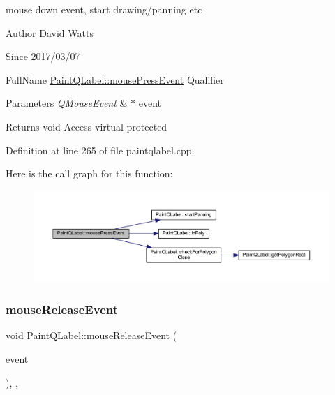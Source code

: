 mouse down event, start drawing/panning etc

\begin{DoxyAuthor}{Author}
David Watts 
\end{DoxyAuthor}
\begin{DoxySince}{Since}
2017/03/07
\end{DoxySince}
Full\+Name \hyperlink{class_paint_q_label_a222bf479767638c91bb0b8b655e9794b}{Paint\+Q\+Label\+::mouse\+Press\+Event} Qualifier 
\begin{DoxyParams}{Parameters}
{\em Q\+Mouse\+Event} & $\ast$ event \\
\hline
\end{DoxyParams}
\begin{DoxyReturn}{Returns}
void Access virtual protected 
\end{DoxyReturn}


Definition at line 265 of file paintqlabel.\+cpp.

Here is the call graph for this function\+:
\nopagebreak
\begin{figure}[H]
\begin{center}
\leavevmode
\includegraphics[width=350pt]{class_paint_q_label_a222bf479767638c91bb0b8b655e9794b_cgraph}
\end{center}
\end{figure}
\mbox{\label{class_paint_q_label_a16f35714b89231d55c733ef94f583ff4}} 
\subsubsection{\texorpdfstring{mouse\+Release\+Event}{mouseReleaseEvent}}
{\footnotesize\ttfamily void Paint\+Q\+Label\+::mouse\+Release\+Event (\begin{DoxyParamCaption}\item[{Q\+Mouse\+Event $\ast$}]{event }\end{DoxyParamCaption})\hspace{0.3cm}{\ttfamily [protected]}, {\ttfamily [virtual]}, {\ttfamily [slot]}}


